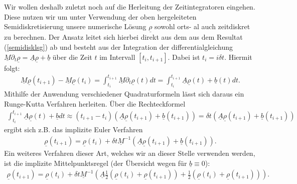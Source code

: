 Wir wollen deshalb zuletzt noch auf die Herleitung der Zeitintegratoren eingehen. Diese nutzen wir um unter Verwendung der oben hergeleiteten Semidiskretisierung unsere numerische Lösung $ \underline{\rho} $ sowohl orts- al auch zeitdiskret zu berechnen. Der Ansatz leitet sich hierbei direkt aus dem  aus dem Resultat (\ref{semidisklsg}) ab und besteht aus der 
Integration der differentialgleichung $\underline{M} \partial_t \underline{\rho} = \underline{A} \underline{\rho} + \underline{b}$ über die Zeit $t$ im Intervall $[t_i, t_{i+1}]$.
Dabei ist $t_i = i \delta t$. Hiermit folgt:
\begin{align*}
\underline{M}\underline{\rho}(t_{i+1}) - \underline{M}\underline{\rho}(t_i) = \int_{t_i}^{t_{i+1}}
\underline{M} \partial_t \underline{\rho}(t) dt =\int_{t_i}^{t_{i+1}} \underline{A} \underline{\rho}(t) + \underline{b}(t) dt.
\end{align*}
Mithilfe der Anwendung verschiedener Quadraturformeln lässt sich daraus ein Runge-Kutta Verfahren herleiten. Über die Rechteckformel 
\begin{align*}
\int_{t_i}^{t_{i+1}}\underline{A} \underline{\rho}(t) + \underline{b} dt \approx (t_{i+1}-t_i)( 
\underline{A} \underline{\rho}(t_{i+1}) + \underline{b}(t_{i+1})) = \delta t (\underline{A} \underline{\rho}(t_{i+1}) + \underline{b}(t_{i+1}))
\end{align*}
ergibt sich z.B. das implizite Euler Verfahren
\begin{align*}
\underline{\rho}(t_{i+1}) = \underline{\rho}(t_{i}) + \delta t \underline{M}^{-1}(\underline{A} \underline{\rho}(t_{i+1}) + \underline{b}(t_{i+1})).
\end{align*}
Ein weiteres Verfahren dieser Art, welches wir an dieser Stelle verwenden werden, ist die implizite Mittelpunktsregel (der Übersicht wegen für $\underline{b} \equiv 0$):
\begin{align*}
\underline{\rho}(t_{i+1}) = \underline{\rho}(t_{i}) +
\delta t \underline{M}^{-1} (
\underline{A} 
\frac{1}{2}(\underline{\rho}(t_{i}) +
\underline{\rho}(t_{i+1}) )
+
\frac{1}{2} ( \underline{\rho}(t_{i}) +
\underline{\rho}(t_{i+1}) )).
\end{align*}

